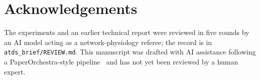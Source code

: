 \documentclass[11pt,a4paper]{article}
\begin{document}
\section*{Acknowledgements}
The experiments and an earlier technical report were reviewed in five rounds by an AI model acting as a network-physiology referee; the record is in \texttt{atds\_brief/REVIEW.md}. This manuscript was drafted with AI assistance following a PaperOrchestra-style pipeline~\cite{song2026paperorchestra} and has not yet been reviewed by a human expert.



\end{document}

